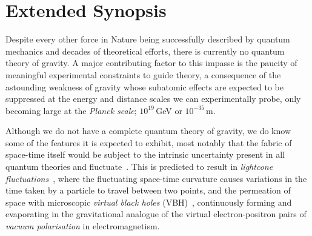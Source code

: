 \documentclass[a4paper,11pt]{article}
\begin{document}
\newpage

\section{Extended Synopsis}
\vspace{0.1 cm}




Despite every other force in Nature being successfully described by quantum mechanics and decades of theoretical efforts, there is currently no quantum theory of gravity. A major contributing factor to this impasse is the paucity of meaningful experimental constraints to guide theory, a consequence of the astounding weakness of gravity whose subatomic effects are expected to be suppressed at the energy and distance scales we can experimentally probe, only becoming large at the \textit{Planck scale}; $10^{19}$\,GeV or $10^{-35}$\,m.

Although we do not have a complete quantum theory of gravity, we do know some of the features it is expected to exhibit, most notably that the fabric of space-time itself would be subject to the intrinsic uncertainty present in all quantum theories and fluctuate~\cite{PhysRev.97.511, Hawking}. This is predicted to result in \textit{lightcone fluctuations}~\cite{PauliLightcone, Ford1999, gr-qc/9909085, Ellis:1999jf}, where the fluctuating space-time curvature causes variations in the time taken by a particle to travel between two points, and the permeation of space with microscopic \textit{virtual black holes} (VBH)~\cite{Hawking1982,PhysRevD.53.3099}, continuously forming and evaporating in the gravitational analogue of the virtual electron-positron pairs of \textit{vacuum polarisation} in electromagnetism. 
\end{document}
